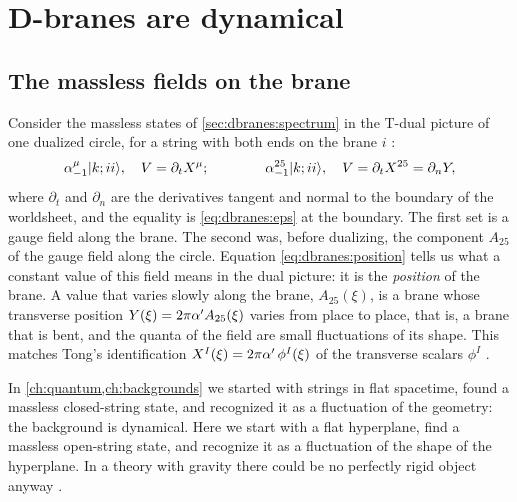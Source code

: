 \section{D-branes are dynamical}\label{sec:dbranes:dynamics}

\subsection{The massless fields on the brane}

Consider the massless states of \cref{sec:dbranes:spectrum} in the T-dual picture of one
dualized circle, for a string with both ends on the brane $i$ :
\begin{equation}\label{eq:dbranes:massless}
 \alpha^\mu_{-1}|k;ii\rangle,\quad V=\partial_tX^\mu;\qquad\qquad
 \alpha^{25}_{-1}|k;ii\rangle,\quad V=\partial_tX^{25}=\partial_nY ,
\end{equation}
where $\partial_t$ and $\partial_n$ are the derivatives tangent and normal to the boundary of the
worldsheet, and the equality is \eqref{eq:dbranes:eps} at the boundary. The first set is a gauge
field along the brane. The second was, before dualizing, the component $A_{25}$ of the gauge
field along the circle. Equation \eqref{eq:dbranes:position} tells us what a constant value of
this field means in the dual picture: it is the \emph{position} of the brane. A value that varies
slowly along the brane, $A_{25}(\xi)$, is a brane whose transverse position
$Y(\xi)=2\pi\alpha' A_{25}(\xi)$ varies from place to place, that is, a brane that is bent, and
the quanta of the field are small fluctuations of its shape. This matches Tong's identification
$X^I(\xi)=2\pi\alpha'\,\phi^I(\xi)$ of the transverse scalars $\phi^I$ .

\begin{physicsbox}
In \cref{ch:quantum,ch:backgrounds} we started with strings in flat spacetime, found a massless
closed-string state, and recognized it as a fluctuation of the geometry: the background is
dynamical. Here we start with a flat hyperplane, find a massless open-string state, and
recognize it as a fluctuation of the shape of the hyperplane. In a theory with gravity there
could be no perfectly rigid object anyway .
\end{physicsbox}

